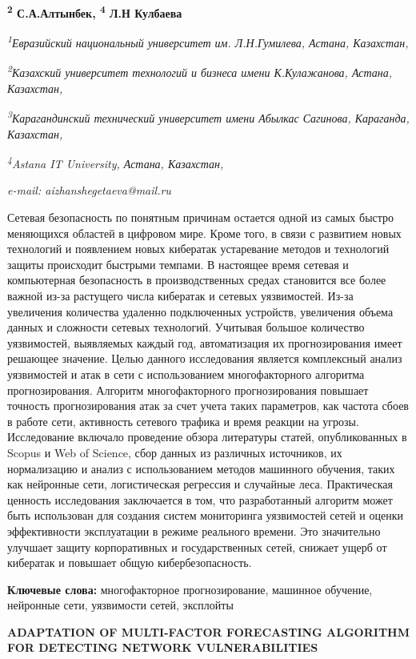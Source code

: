 {\bfseries \textsuperscript{2} С.А.Алтынбек, \textsuperscript{4} Л.Н
Кулбаева}

\emph{\textsuperscript{1}Евразийский национальный университет им.
Л.Н.Гумилева, Астана, Казахстан,}

\emph{\textsuperscript{2}Казахский университет технологий и бизнеса
имени К.Кулажанова, Астана, Казахстан,}

\emph{\textsuperscript{3}Карагандинский технический университет имени
Абылкас Сагинова, Караганда, Казахстан,}

\emph{\textsuperscript{4}Astana IT University, Астана, Казахстан,}

\emph{e-mail: aizhanshegetaeva@mail.ru}

Сетевая безопасность по понятным причинам остается одной из самых быстро
меняющихся областей в цифровом мире. Кроме того, в связи с развитием
новых технологий и появлением новых кибератак устаревание методов и
технологий защиты происходит быстрыми темпами. В настоящее время сетевая
и компьютерная безопасность в производственных средах становится все
более важной из-за растущего числа кибератак и сетевых уязвимостей.
Из-за увеличения количества удаленно подключенных устройств, увеличения
объема данных и сложности сетевых технологий. Учитывая большое
количество уязвимостей, выявляемых каждый год, автоматизация их
прогнозирования имеет решающее значение. Целью данного исследования
является комплексный анализ уязвимостей и атак в сети с использованием
многофакторного алгоритма прогнозирования. Алгоритм многофакторного
прогнозирования повышает точность прогнозирования атак за счет учета
таких параметров, как частота сбоев в работе сети, активность сетевого
трафика и время реакции на угрозы. Исследование включало проведение
обзора литературы статей, опубликованных в Scopus и Web of Science, сбор
данных из различных источников, их нормализацию и анализ с
использованием методов машинного обучения, таких как нейронные сети,
логистическая регрессия и случайные леса. Практическая ценность
исследования заключается в том, что разработанный алгоритм может быть
использован для создания систем мониторинга уязвимостей сетей и оценки
эффективности эксплуатации в режиме реального времени. Это значительно
улучшает защиту корпоративных и государственных сетей, снижает ущерб от
кибератак и повышает общую кибербезопасность.

{\bfseries Ключевые слова:} многофакторное прогнозирование, машинное
обучение, нейронные сети, уязвимости сетей, эксплойты

{\bfseries ADAPTATION OF MULTI-FACTOR FORECASTING ALGORITHM FOR DETECTING
NETWORK VULNERABILITIES}

